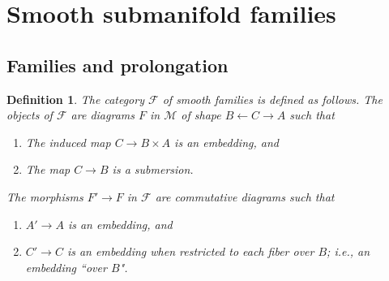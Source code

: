 \documentclass[12pt]{article}
\numberwithin{equation}{section}
\theoremstyle{plain}
\newtheorem{definition}{Definition}[section]
\theoremstyle{definition}
\renewcommand{\P}{\mathbb{P}}
\newcommand{\R}{\mathbb{R}}
\newcommand{\M}{\mathcal{M}}
\newcommand{\F}{\mathcal{F}}
\newcommand{\la}{\leftarrow}
\newcommand{\ra}{\rightarrow}
\begin{document}





\section{Smooth submanifold families}\label{smfam}

\subsection{Families and prolongation}

\begin{definition}\label{catfam} The category $\F$ of \emph{smooth families} is defined as follows. The objects of $\F$ are diagrams $F$ in $\M$ of shape $B\la C\ra A$ such that

\begin{enumerate}
\itemsep0em
\item{The induced map $C\ra B\times A$ is an embedding, and}
\item{The map $C\ra B$ is a submersion.}
\end{enumerate}

The morphisms $F'\ra F$ in $\F$ are commutative diagrams such that 

\begin{enumerate}
\itemsep0em
\item{$A'\ra A$ is an embedding, and}
\item{$C'\ra C$ is an embedding when restricted to each fiber over $B$; i.e., an embedding ``over $B$".}
\end{enumerate}

\end{definition}
\end{document}
